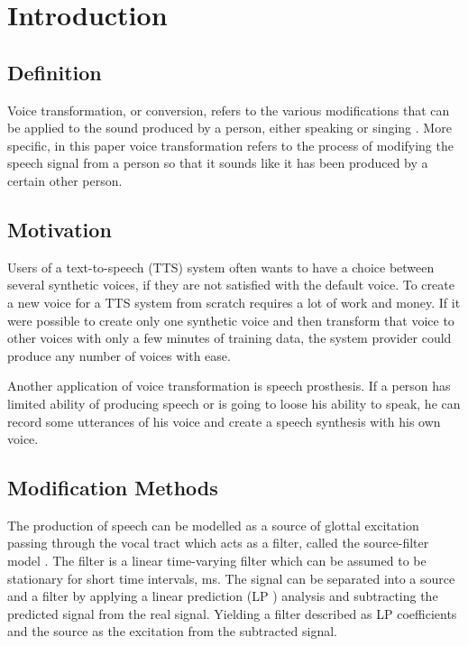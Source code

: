 \chapter{Introduction} %
\label{cha:introduction}
  

\section{Definition} %
\label{sec:definition}
Voice transformation, or conversion, refers to the various modifications that can be applied to the sound produced by a person, either speaking or singing \cite{stylianou08}. More specific, in this paper voice transformation refers to the process of modifying the speech signal from a person so that it sounds like it has been produced by a certain other person. 

\section{Motivation} %
\label{sec:motivation}
Users of a text-to-speech (TTS) system often wants to have a choice between several synthetic voices, if they are not satisfied with the default voice. To create a new voice for a TTS system from scratch requires a lot of work and money. If it were possible to create only one synthetic voice and then transform that voice to other voices with only a few minutes of  training data, the system provider could produce any number of voices with ease. 

Another application of voice transformation is speech prosthesis. If a person has limited ability of producing speech or is going to loose his ability to speak, he can record some utterances of his voice and create a speech synthesis with his own voice.

\section{Modification Methods} %
\label{sec:synthesis_methods}
The production of speech can be modelled as a source of glottal excitation passing through the vocal tract which acts as a filter, called the source-filter model \cite{taletek}. The filter is a linear time-varying filter which can be assumed to be stationary for short time intervals,  ms. The signal can be separated into a source and a filter by applying a linear prediction (LP ) analysis and subtracting the predicted signal from the real signal. Yielding a filter described as LP coefficients and the source as the excitation from the subtracted signal.

